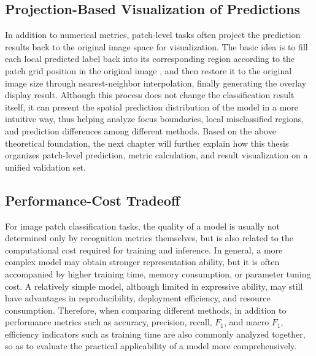 \subsection{Projection-Based Visualization of Predictions}
\par In addition to numerical metrics, patch-level tasks often project the
prediction results back to the original image space for visualization. The
basic idea is to fill each local predicted label back into its corresponding
region according to the patch grid position in the original image
\cite{Long_2015_CVPR,Zhou_2016_CVPR}, and then restore it to the original image
size through nearest-neighbor interpolation, finally generating the overlay
display result. Although this process does not change the classification result
itself, it can present the spatial prediction distribution of the model in a
more intuitive way, thus helping analyze focus boundaries, local misclassified
regions, and prediction differences among different methods. Based on the above
theoretical foundation, the next chapter will further explain how this thesis
organizes patch-level prediction, metric calculation, and result visualization
on a unified validation set.

\subsection{Performance-Cost Tradeoff}
\par For image patch classification tasks, the quality of a model is usually not
determined only by recognition metrics themselves, but is also related to the
computational cost required for training and inference. In general, a more
complex model may obtain stronger representation ability, but it is often
accompanied by higher training time, memory consumption, or parameter tuning
cost. A relatively simple model, although limited in expressive ability, may
still have advantages in reproducibility, deployment efficiency, and resource
consumption. Therefore, when comparing different methods, in addition to
performance metrics such as accuracy, precision, recall, $F_1$, and macro
$F_1$, efficiency indicators such as training time are also commonly analyzed
together, so as to evaluate the practical applicability of a model more
comprehensively.
